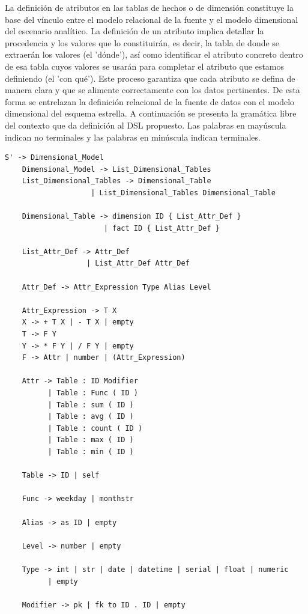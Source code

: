 La definici\'on de atributos en las tablas de hechos o de dimensi\'on constituye la base del v\'inculo entre 
el modelo relacional de la fuente y el modelo dimensional del escenario analítico. La definición de un atributo 
implica detallar la procedencia y los valores que lo constituirán, es decir, la tabla de donde se extraerán los 
valores (el 'dónde'), 
así como identificar el atributo concreto dentro de esa tabla cuyos valores se usarán para completar el atributo 
que estamos definiendo (el 'con qué'). Este proceso garantiza que cada atributo se defina de manera clara y que 
se alimente correctamente con los datos pertinentes. De esta forma se entrelazan la definici\'on relacional 
de la fuente de datos con el modelo dimensional del esquema estrella. A continuación se presenta la gramática 
libre del contexto que da definición al DSL propuesto. Las palabras en may\'uscula indican no terminales y 
las palabras en min\'uscula indican terminales.

\begin{lstlisting}[caption={Gram\'atica libre del contexto del lenguaje de dominio espec\'ifico}]
    S' -> Dimensional_Model
    Dimensional_Model -> List_Dimensional_Tables
    List_Dimensional_Tables -> Dimensional_Table
                    | List_Dimensional_Tables Dimensional_Table

    Dimensional_Table -> dimension ID { List_Attr_Def }
                       | fact ID { List_Attr_Def }

    List_Attr_Def -> Attr_Def
                   | List_Attr_Def Attr_Def

    Attr_Def -> Attr_Expression Type Alias Level

    Attr_Expression -> T X
    X -> + T X | - T X | empty
    T -> F Y
    Y -> * F Y | / F Y | empty
    F -> Attr | number | (Attr_Expression)

    Attr -> Table : ID Modifier
          | Table : Func ( ID )
          | Table : sum ( ID )
          | Table : avg ( ID )
          | Table : count ( ID )
          | Table : max ( ID )
          | Table : min ( ID )

    Table -> ID | self

    Func -> weekday | monthstr

    Alias -> as ID | empty

    Level -> number | empty

    Type -> int | str | date | datetime | serial | float | numeric 
          | empty

    Modifier -> pk | fk to ID . ID | empty
\end{lstlisting}

